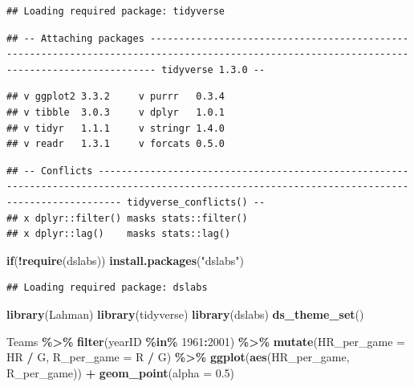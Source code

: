 \documentclass[
]{article}
\newenvironment{Shaded}{\begin{snugshade}}{\end{snugshade}}
\newcommand{\ControlFlowTok}[1]{\textcolor[rgb]{0.13,0.29,0.53}{\textbf{#1}}}
\newcommand{\DataTypeTok}[1]{\textcolor[rgb]{0.13,0.29,0.53}{#1}}
\newcommand{\DecValTok}[1]{\textcolor[rgb]{0.00,0.00,0.81}{#1}}
\newcommand{\FloatTok}[1]{\textcolor[rgb]{0.00,0.00,0.81}{#1}}
\newcommand{\KeywordTok}[1]{\textcolor[rgb]{0.13,0.29,0.53}{\textbf{#1}}}
\newcommand{\NormalTok}[1]{#1}
\newcommand{\OperatorTok}[1]{\textcolor[rgb]{0.81,0.36,0.00}{\textbf{#1}}}
\newcommand{\StringTok}[1]{\textcolor[rgb]{0.31,0.60,0.02}{#1}}
\begin{document}
\begin{verbatim}
## Loading required package: tidyverse
\end{verbatim}

\begin{verbatim}
## -- Attaching packages --------------------------------------------------------------------------------------------------------------------------------------------- tidyverse 1.3.0 --
\end{verbatim}

\begin{verbatim}
## v ggplot2 3.3.2     v purrr   0.3.4
## v tibble  3.0.3     v dplyr   1.0.1
## v tidyr   1.1.1     v stringr 1.4.0
## v readr   1.3.1     v forcats 0.5.0
\end{verbatim}

\begin{verbatim}
## -- Conflicts ------------------------------------------------------------------------------------------------------------------------------------------------ tidyverse_conflicts() --
## x dplyr::filter() masks stats::filter()
## x dplyr::lag()    masks stats::lag()
\end{verbatim}

\begin{Shaded}
\begin{Highlighting}[]
\ControlFlowTok{if}\NormalTok{(}\OperatorTok{!}\KeywordTok{require}\NormalTok{(dslabs)) }\KeywordTok{install.packages}\NormalTok{(}\StringTok{"dslabs"}\NormalTok{)}
\end{Highlighting}
\end{Shaded}

\begin{verbatim}
## Loading required package: dslabs
\end{verbatim}

\begin{Shaded}
\begin{Highlighting}[]
\KeywordTok{library}\NormalTok{(Lahman)}
\KeywordTok{library}\NormalTok{(tidyverse)}
\KeywordTok{library}\NormalTok{(dslabs)}
\KeywordTok{ds\_theme\_set}\NormalTok{()}

\NormalTok{Teams }\OperatorTok{\%\textgreater{}\%}\StringTok{ }\KeywordTok{filter}\NormalTok{(yearID }\OperatorTok{\%in\%}\StringTok{ }\DecValTok{1961}\OperatorTok{:}\DecValTok{2001}\NormalTok{) }\OperatorTok{\%\textgreater{}\%}
\StringTok{    }\KeywordTok{mutate}\NormalTok{(}\DataTypeTok{HR\_per\_game =}\NormalTok{ HR }\OperatorTok{/}\StringTok{ }\NormalTok{G, }\DataTypeTok{R\_per\_game =}\NormalTok{ R }\OperatorTok{/}\StringTok{ }\NormalTok{G) }\OperatorTok{\%\textgreater{}\%}
\StringTok{    }\KeywordTok{ggplot}\NormalTok{(}\KeywordTok{aes}\NormalTok{(HR\_per\_game, R\_per\_game)) }\OperatorTok{+}\StringTok{ }
\StringTok{    }\KeywordTok{geom\_point}\NormalTok{(}\DataTypeTok{alpha =} \FloatTok{0.5}\NormalTok{)}
\end{Highlighting}
\end{Shaded}
\end{document}
